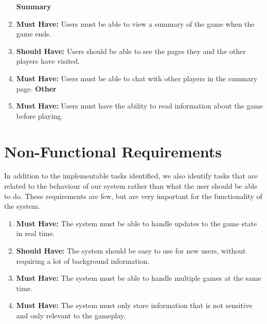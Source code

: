 \documentclass{l4proj}
\begin{document}
\begin{enumerate}
\textbf{Summary}
    \item \textbf{Must Have:}  Users must be able to view a summary of the game when the game ends.
    \item \textbf{Should Have:} Users should be able to see the pages they and the other players have visited.
    \item \textbf{Must Have:}  Users must be able to chat with other players in the summary page.
\textbf{Other}
    \item \textbf{Must Have:} Users must have the ability to read information about the game before playing.

\end{enumerate}

\section{Non-Functional Requirements}
In addition to the implementable tasks identified, we also identify tasks that are related to the behaviour of our system rather than what the user should be able to do. These requirements are few, but are very important for the functionality of the system.  

\begin{enumerate}
    \item \textbf{Must Have:}  The system must be able to handle updates to the game state in real time.
    \item \textbf{Should Have:} The system should be easy to use for new users, without requiring a lot of background information.
    \item \textbf{Must Have:} The system must be able to handle multiple games at the same time.
    \item \textbf{Must Have:} The system must only store information that is not sensitive and only relevant to the gameplay.
\end{enumerate}
\end{document}

